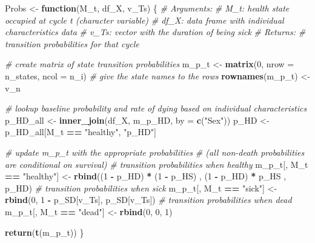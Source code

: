 \documentclass[]{article}
\newenvironment{Shaded}{\begin{snugshade}}{\end{snugshade}}
\newcommand{\KeywordTok}[1]{\textcolor[rgb]{0.13,0.29,0.53}{\textbf{#1}}}
\newcommand{\DataTypeTok}[1]{\textcolor[rgb]{0.13,0.29,0.53}{#1}}
\newcommand{\DecValTok}[1]{\textcolor[rgb]{0.00,0.00,0.81}{#1}}
\newcommand{\StringTok}[1]{\textcolor[rgb]{0.31,0.60,0.02}{#1}}
\newcommand{\CommentTok}[1]{\textcolor[rgb]{0.56,0.35,0.01}{\textit{#1}}}
\newcommand{\ControlFlowTok}[1]{\textcolor[rgb]{0.13,0.29,0.53}{\textbf{#1}}}
\newcommand{\OperatorTok}[1]{\textcolor[rgb]{0.81,0.36,0.00}{\textbf{#1}}}
\newcommand{\NormalTok}[1]{#1}
\begin{document}
\begin{Shaded}
\begin{Highlighting}[]
\NormalTok{Probs <-}\StringTok{ }\ControlFlowTok{function}\NormalTok{(M_t, df_X, v_Ts) \{ }
  \CommentTok{# Arguments:}
    \CommentTok{# M_t: health state occupied at cycle t (character variable)}
    \CommentTok{# df_X: data frame with individual characteristics data }
    \CommentTok{# v_Ts: vector with the duration of being sick}
  \CommentTok{# Returns: }
    \CommentTok{# transition probabilities for that cycle}
  
  \CommentTok{# create matrix of state transition probabilities}
\NormalTok{  m_p_t           <-}\StringTok{ }\KeywordTok{matrix}\NormalTok{(}\DecValTok{0}\NormalTok{, }\DataTypeTok{nrow =}\NormalTok{ n_states, }\DataTypeTok{ncol =}\NormalTok{ n_i)  }
  \CommentTok{# give the state names to the rows}
  \KeywordTok{rownames}\NormalTok{(m_p_t) <-}\StringTok{  }\NormalTok{v_n                               }
  
  \CommentTok{# lookup baseline probability and rate of dying based on individual characteristics}
\NormalTok{  p_HD_all <-}\StringTok{ }\KeywordTok{inner_join}\NormalTok{(df_X, m_p_HD, }\DataTypeTok{by =} \KeywordTok{c}\NormalTok{(}\StringTok{"Sex"}\NormalTok{))}
\NormalTok{  p_HD     <-}\StringTok{ }\NormalTok{p_HD_all[M_t }\OperatorTok{==}\StringTok{ "healthy"}\NormalTok{, }\StringTok{"p_HD"}\NormalTok{]}
  
  \CommentTok{# update m_p_t with the appropriate probabilities }
  \CommentTok{# (all non-death probabilities are conditional on survival)}
  \CommentTok{# transition probabilities when healthy }
\NormalTok{  m_p_t[, M_t }\OperatorTok{==}\StringTok{ "healthy"}\NormalTok{] <-}\StringTok{ }\KeywordTok{rbind}\NormalTok{((}\DecValTok{1} \OperatorTok{-}\StringTok{ }\NormalTok{p_HD) }\OperatorTok{*}\StringTok{ }\NormalTok{(}\DecValTok{1} \OperatorTok{-}\StringTok{ }\NormalTok{p_HS) ,}
\NormalTok{                                     (}\DecValTok{1} \OperatorTok{-}\StringTok{ }\NormalTok{p_HD) }\OperatorTok{*}\StringTok{      }\NormalTok{p_HS  ,}
\NormalTok{                                          p_HD)    }
  \CommentTok{# transition probabilities when sick }
\NormalTok{  m_p_t[, M_t }\OperatorTok{==}\StringTok{ "sick"}\NormalTok{]    <-}\StringTok{ }\KeywordTok{rbind}\NormalTok{(}\DecValTok{0}\NormalTok{,}
                                     \DecValTok{1} \OperatorTok{-}\StringTok{ }\NormalTok{p_SD[v_Ts],}
\NormalTok{                                         p_SD[v_Ts])  }
  \CommentTok{# transition probabilities when dead     }
\NormalTok{  m_p_t[, M_t }\OperatorTok{==}\StringTok{ "dead"}\NormalTok{]    <-}\StringTok{ }\KeywordTok{rbind}\NormalTok{(}\DecValTok{0}\NormalTok{,}
                                     \DecValTok{0}\NormalTok{,}
                                     \DecValTok{1}\NormalTok{)                            }
  
  \KeywordTok{return}\NormalTok{(}\KeywordTok{t}\NormalTok{(m_p_t))}
\NormalTok{\}       }
\end{Highlighting}
\end{Shaded}
\end{document}
